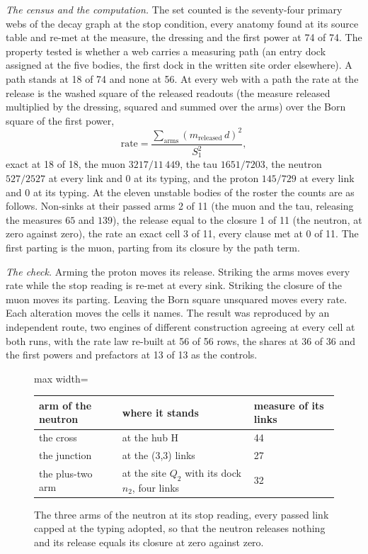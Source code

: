 \begin{chproof}
\textit{The census and the computation.} The set counted is the seventy-four primary webs of the decay graph at the stop condition, every anatomy found at its source table and re-met at the measure, the dressing and the first power at 74 of 74. The property tested is whether a web carries a measuring path (an entry dock assigned at the five bodies, the first dock in the written site order elsewhere). A path stands at 18 of 74 and none at 56. At every web with a path the rate at the release is the washed square of the released readouts (the measure released multiplied by the dressing, squared and summed over the arms) over the Born square of the first power,
\begin{equation}
\text{rate}=\frac{\sum_{\text{arms}} (m_{\text{released}}\, d)^{2}}{S_1^{2}} ,
\end{equation}
exact at 18 of 18, the muon $3217/11\,449$, the tau $1651/7203$, the neutron $527/2527$ at every link and $0$ at its typing, and the proton $145/729$ at every link and $0$ at its typing. At the eleven unstable bodies of the roster the counts are as follows. Non-sinks at their passed arms 2 of 11 (the muon and the tau, releasing the measures $65$ and $139$), the release equal to the closure 1 of 11 (the neutron, at zero against zero), the rate an exact cell 3 of 11, every clause met at 0 of 11. The first parting is the muon, parting from its closure by the path term.

\textit{The check.} Arming the proton moves its release. Striking the arms moves every rate while the stop reading is re-met at every sink. Striking the closure of the muon moves its parting. Leaving the Born square unsquared moves every rate. Each alteration moves the cells it names. The result was reproduced by an independent route, two engines of different construction agreeing at every cell at both runs, with the rate law re-built at 56 of 56 rows, the shares at 36 of 36 and the first powers and prefactors at 13 of 13 as the controls.
\end{chproof}
\begin{figure}[h]
\centering
\begin{adjustbox}{max width=\linewidth}\begin{tabular}{lll}
\hline
arm of the neutron & where it stands & measure of its links \\
\hline
the cross & at the hub H & 44 \\
the junction & at the (3,3) links & 27 \\
the plus-two arm & at the site $Q_2$ with its dock $n_2$, four links & 32 \\
\hline
\end{tabular}\end{adjustbox}
\caption{The three arms of the neutron at its stop reading, every passed link capped at the typing adopted, so that the neutron releases nothing and its release equals its closure at zero against zero.}
\end{figure}
